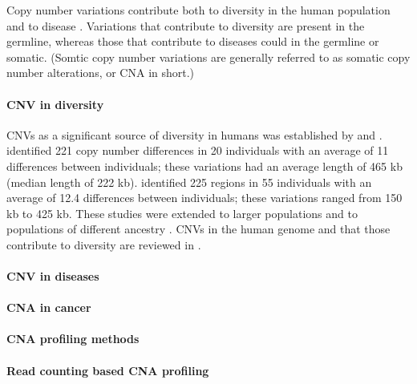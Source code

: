 Copy number variations contribute both to diversity in the human
population and to disease \citep{}.
Variations that contribute to diversity are present in the germline,
whereas those that contribute to diseases could in the germline or
somatic. (Somtic copy number variations are generally referred to as
somatic copy number alterations, or CNA in short.)

\paragraph{CNV in diversity}
CNVs as a significant source of diversity in humans was established by
\cite{sebat2004large} and \cite{iafrate2004detection}. 
%
\cite{sebat2004large} identified 221 copy number differences in 20
individuals with an average of 11 differences between individuals; these
variations had an average length of 465 kb (median length of 222 kb).
%
\cite{iafrate2004detection} identified 225 regions in 55 individuals
with an average of 12.4 differences between individuals; these
variations ranged from 150 kb to 425 kb.
%
These studies were extended to larger populations and to populations of
different ancestry \citep{redon2006global,li2009whole}.  CNVs in the
human genome and that those contribute to diversity are reviewed in
\citep{freeman2006copy,feuk2006structural,zarrei2015copy}.

\paragraph{CNV in diseases}


\paragraph{CNA in cancer}




\paragraph{CNA profiling methods}


\paragraph{Read counting based CNA profiling}



